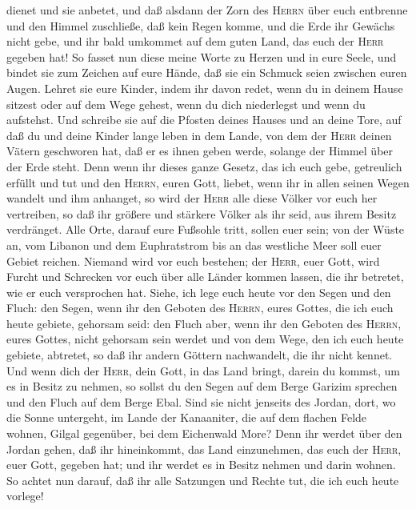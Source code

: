 dienet und sie anbetet,  und daß alsdann der Zorn des
\textsc{Herrn} über euch entbrenne und den Himmel zuschließe, daß kein
Regen komme, und die Erde ihr Gewächs nicht gebe, und ihr bald umkommet
auf dem guten Land, das euch der \textsc{Herr} gegeben hat!
 So fasset nun diese meine Worte zu Herzen und in eure
Seele, und bindet sie zum Zeichen auf eure Hände, daß sie ein Schmuck
seien zwischen euren Augen.  Lehret sie eure Kinder,
indem ihr davon redet, wenn du in deinem Hause sitzest oder auf dem Wege
gehest, wenn du dich niederlegst und wenn du aufstehst. 
Und schreibe sie auf die Pfosten deines Hauses und an deine Tore,
 auf daß du und deine Kinder lange leben in dem Lande,
von dem der \textsc{Herr} deinen Vätern geschworen hat, daß er es ihnen
geben werde, solange der Himmel über der Erde steht. 
Denn wenn ihr dieses ganze Gesetz, das ich euch gebe, getreulich erfüllt
und tut und den \textsc{Herrn}, euren Gott, liebet, wenn ihr in allen
seinen Wegen wandelt und ihm anhanget,  so wird der
\textsc{Herr} alle diese Völker vor euch her vertreiben, so daß ihr
größere und stärkere Völker als ihr seid, aus ihrem Besitz verdränget.
 Alle Orte, darauf eure Fußsohle tritt, sollen euer sein;
von der Wüste an, vom Libanon und dem Euphratstrom bis an das westliche
Meer soll euer Gebiet reichen.  Niemand wird vor euch
bestehen; der \textsc{Herr}, euer Gott, wird Furcht und Schrecken vor
euch über alle Länder kommen lassen, die ihr betretet, wie er euch
versprochen hat.  Siehe, ich lege euch heute vor den
Segen und den Fluch:  den Segen, wenn ihr den Geboten des
\textsc{Herrn}, eures Gottes, die ich euch heute gebiete, gehorsam seid:
 den Fluch aber, wenn ihr den Geboten des \textsc{Herrn},
eures Gottes, nicht gehorsam sein werdet und von dem Wege, den ich euch
heute gebiete, abtretet, so daß ihr andern Göttern nachwandelt, die ihr
nicht kennet.  Und wenn dich der \textsc{Herr}, dein
Gott, in das Land bringt, darein du kommst, um es in Besitz zu nehmen,
so sollst du den Segen auf dem Berge Garizim sprechen und den Fluch auf
dem Berge Ebal.  Sind sie nicht jenseits des Jordan,
dort, wo die Sonne untergeht, im Lande der Kanaaniter, die auf dem
flachen Felde wohnen, Gilgal gegenüber, bei dem Eichenwald More?
 Denn ihr werdet über den Jordan gehen, daß ihr
hineinkommt, das Land einzunehmen, das euch der \textsc{Herr}, euer
Gott, gegeben hat; und ihr werdet es in Besitz nehmen und darin wohnen.
 So achtet nun darauf, daß ihr alle Satzungen und Rechte
tut, die ich euch heute vorlege!

